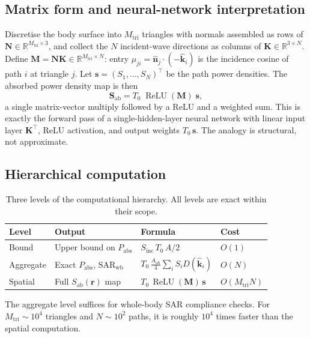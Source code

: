 \documentclass[11pt,a4paper]{article}
\theoremstyle{definition}
\newcommand{\khat}{\hat{\bm{k}}}
\newcommand{\nhat}{\hat{\bm{n}}}
\newcommand{\rr}{\mathbf{r}}
\newcommand{\Sinc}{S_{\mathrm{inc}}}
\newcommand{\Sab}{S_{\mathrm{ab}}}
\newcommand{\Aab}{A_{\mathrm{ab}}}
\newcommand{\SARwb}{\mathrm{SAR}_{\mathrm{wb}}}
\DeclareMathOperator{\ReLU}{ReLU}
\begin{document}
\subsection{Matrix form and neural-network interpretation}

Discretise the body surface into $M_{\mathrm{tri}}$ triangles with
normals assembled as rows of $\mathbf{N}\in\mathbb{R}^{M_{\mathrm{tri}}\times 3}$,
and collect the $N$ incident-wave directions as columns of
$\mathbf{K}\in\mathbb{R}^{3\times N}$.  Define
$\mathbf{M}=\mathbf{N}\mathbf{K}\in\mathbb{R}^{M_{\mathrm{tri}}\times N}$:
entry $\mu_{ji}=\nhat_j\cdot(-\khat_i)$ is the incidence cosine of path
$i$ at triangle $j$.  Let $\mathbf{s}=(S_1,\dots,S_N)^\top$ be the
path power densities.  The absorbed power density map is then
\begin{equation}\label{eq:Sab-mat}
  \mathbf{S}_{\mathrm{ab}} = T_0\;\ReLU(\mathbf{M})\;\mathbf{s},
\end{equation}
a single matrix-vector multiply followed by a ReLU and a weighted sum.
This is exactly the forward pass of a single-hidden-layer neural network
with linear input layer $\mathbf{K}^\top$, ReLU activation, and output
weights $T_0\,\mathbf{s}$.  The analogy is structural, not approximate.

\subsection{Hierarchical computation}

\begin{table}[!htbp]
\centering
\caption{Three levels of the computational hierarchy.  All levels are
  exact within their scope.}\label{tab:hierarchy}
\begin{tabular}{llll}
\toprule
Level & Output & Formula & Cost \\
\midrule
Bound    & Upper bound on $P_{\mathrm{abs}}$ & $\Sinc\,T_0\,A/2$ & $O(1)$ \\
Aggregate & Exact $P_{\mathrm{abs}}$, $\SARwb$ & $T_0\,\frac{\Aab}{4}\sum_i S_i D(\khat_i)$ & $O(N)$ \\
Spatial  & Full $\Sab(\rr)$ map & $T_0\,\ReLU(\mathbf{M})\,\mathbf{s}$ & $O(M_{\mathrm{tri}} N)$ \\
\bottomrule
\end{tabular}
\end{table}

The aggregate level suffices for whole-body SAR compliance checks.
For $M_{\mathrm{tri}}\sim 10^4$ triangles and $N\sim 10^2$ paths, it
is roughly $10^4$ times faster than the spatial computation.
\end{document}
